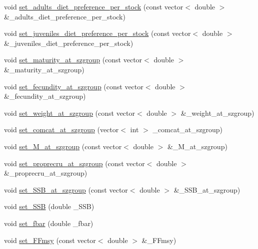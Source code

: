 \begin{DoxyCompactItemize}
\item 
void \mbox{\hyperlink{class_population_ae6110f8d8c552f5ee9b905941861880a}{set\+\_\+adults\+\_\+diet\+\_\+preference\+\_\+per\+\_\+stock}} (const vector$<$ double $>$ \&\+\_\+adults\+\_\+diet\+\_\+preference\+\_\+per\+\_\+stock)
\item 
void \mbox{\hyperlink{class_population_a66752f64f8fa4da941f22030b3196cb3}{set\+\_\+juveniles\+\_\+diet\+\_\+preference\+\_\+per\+\_\+stock}} (const vector$<$ double $>$ \&\+\_\+juveniles\+\_\+diet\+\_\+preference\+\_\+per\+\_\+stock)
\item 
void \mbox{\hyperlink{class_population_acb3b8344976ea406a39a0125d3375d7e}{set\+\_\+maturity\+\_\+at\+\_\+szgroup}} (const vector$<$ double $>$ \&\+\_\+maturity\+\_\+at\+\_\+szgroup)
\item 
void \mbox{\hyperlink{class_population_a5ac5539c89af87a8388f126a319741a9}{set\+\_\+fecundity\+\_\+at\+\_\+szgroup}} (const vector$<$ double $>$ \&\+\_\+fecundity\+\_\+at\+\_\+szgroup)
\item 
void \mbox{\hyperlink{class_population_a74eb37544d99f1288d4d5f089d044c59}{set\+\_\+weight\+\_\+at\+\_\+szgroup}} (const vector$<$ double $>$ \&\+\_\+weight\+\_\+at\+\_\+szgroup)
\item 
void \mbox{\hyperlink{class_population_a7830822885d1da429c415d46fdca1de7}{set\+\_\+comcat\+\_\+at\+\_\+szgroup}} (vector$<$ int $>$ \+\_\+comcat\+\_\+at\+\_\+szgroup)
\item 
void \mbox{\hyperlink{class_population_a7006a7a5ffbe9b2d998fe5612b8aec1a}{set\+\_\+\+M\+\_\+at\+\_\+szgroup}} (const vector$<$ double $>$ \&\+\_\+\+M\+\_\+at\+\_\+szgroup)
\item 
void \mbox{\hyperlink{class_population_a8d993fd969c98589ec829c5ade305148}{set\+\_\+proprecru\+\_\+at\+\_\+szgroup}} (const vector$<$ double $>$ \&\+\_\+proprecru\+\_\+at\+\_\+szgroup)
\item 
void \mbox{\hyperlink{class_population_ab3a76f6f7cd4ba9424c761a675fbd9ab}{set\+\_\+\+S\+S\+B\+\_\+at\+\_\+szgroup}} (const vector$<$ double $>$ \&\+\_\+\+S\+S\+B\+\_\+at\+\_\+szgroup)
\item 
void \mbox{\hyperlink{class_population_a806afc3b2b1d3abbcddafe0d2df2822e}{set\+\_\+\+S\+SB}} (double \+\_\+\+S\+SB)
\item 
void \mbox{\hyperlink{class_population_aadd6481dcab8e0a35e73b03b0e5e82c1}{set\+\_\+fbar}} (double \+\_\+fbar)
\item 
void \mbox{\hyperlink{class_population_ab0aa3da4fff8dfce23d6c39ddd5c0cee}{set\+\_\+\+F\+Fmsy}} (const vector$<$ double $>$ \&\+\_\+\+F\+Fmsy)

\end{DoxyCompactItemize}
